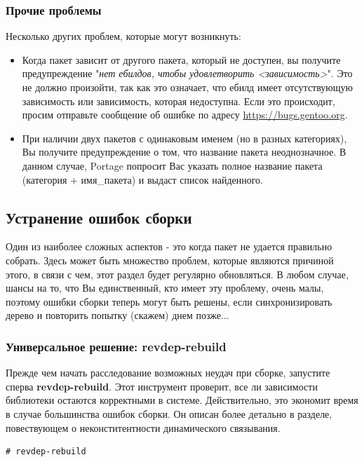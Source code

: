 \documentclass[10pt]{book}
\begin{document}
\subsubsection{Прочие проблемы}

Несколько других проблем, которые могут возникнуть: 

\begin{itemize}
\item Когда пакет зависит от другого пакета, который не доступен, вы получите предупреждение "\textit{нет ебилдов, чтобы удовлетворить <зависимость>}". Это не должно произойти, так как это означает, что ебилд имеет отсутствующую зависимость или зависимость, которая недоступна. Если это происходит, просим отправьте сообщение об ошибке по адресу \href{https://bugs.gentoo.org}{https://bugs.gentoo.org}. 
\item При наличии двух пакетов с одинаковым именем (но в разных категориях), Вы получите предупреждение о том, что название пакета неоднозначное. В данном случае, Portage попросит Вас указать полное название пакета (категория + имя\_пакета) и выдаст список найденного.
\end{itemize}

\subsection{Устранение ошибок сборки}

Один из наиболее сложных аспектов - это когда пакет не удается правильно собрать. Здесь может быть множество проблем, которые являются причиной этого, в связи с чем, этот раздел будет регулярно обновляться. В любом случае, шансы на то, что Вы единственный, кто имеет эту проблему, очень малы, поэтому ошибки сборки теперь могут быть решены, если синхронизировать дерево и повторить попытку (скажем) днем позже...

\subsubsection{Универсальное решение: revdep-rebuild}

Прежде чем начать расследование возможных неудач при сборке, запустите сперва \textbf{revdep-rebuild}. Этот инструмент проверит, все ли зависимости библиотеки остаются корректными в системе. Действительно, это экономит время в случае большинства ошибок сборки. Он описан более детально в разделе, повествующем о неконститентности динамического связывания.

 \begin{tcolorbox}
\begin{lstlisting}
# revdep-rebuild
\end{lstlisting}
\end{tcolorbox}
\end{document}
